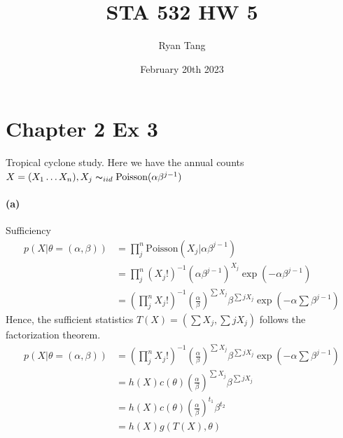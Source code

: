 \documentclass[11pt, letterpaper]{article}
\author{Ryan Tang}
\title{STA 532 HW 5}
\date{February 20th 2023}
\begin{document}
\maketitle

\section{Chapter 2 Ex 3}
Tropical cyclone study. Here we have the annual counts $X = (X_1 \dots X_n), X_j \thicksim_{iid} \text{Poisson}(\alpha\beta^{j-1})$
\paragraph{(a)} Sufficiency
\begin{align*}
    p(X|\theta=(\alpha, \beta)) &= \prod_j^n \text{Poisson}(X_j|\alpha \beta^{j-1}) \\
        &= \prod_j^n (X_j!)^{-1} (\alpha\beta^{j-1})^{X_j} \exp(-\alpha\beta^{j-1}) \\
        &= (\prod_j^n X_j!)^{-1} (\frac{\alpha}{\beta})^{\sum X_j} \beta^{\sum jX_j} \exp(-\alpha \sum \beta^{j-1})
\end{align*}
Hence, the sufficient statistics $T(X) = (\sum X_j, \sum jX_j)$ follows the factorization theorem.
\begin{align*}
    p(X|\theta=(\alpha, \beta))
        &= (\prod_j^n X_j!)^{-1} (\frac{\alpha}{\beta})^{\sum X_j} \beta^{\sum jX_j} \exp(-\alpha \sum \beta^{j-1}) \\
        &= h(X) c(\theta) (\frac{\alpha}{\beta})^{\sum X_j} \beta^{\sum jX_j} \\
        &= h(X) c(\theta) (\frac{\alpha}{\beta})^{t_1} \beta^{t_2} \\
        &= h(X) g(T(X), \theta)
\end{align*}
\end{document}

